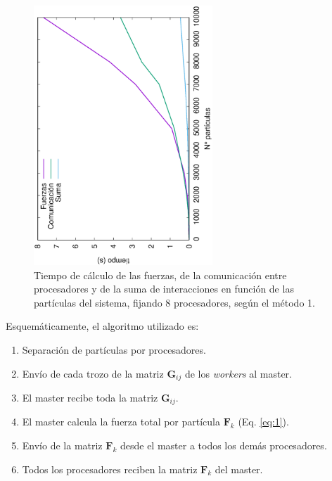 \documentclass[onecolumn]{article}
\renewcommand{\vec}[1]{\mathbf{#1}}
\begin{document}
\begin{figure}[ht]
\begin{center}
\includegraphics[width=0.6\textwidth, angle=-90]{time_particlesE.eps}
\caption{Tiempo de cálculo de las fuerzas, de la comunicación entre procesadores y de la suma de interacciones en función de las partículas del sistema, fijando 8 procesadores, según el método 1.}
\label{elena_1}
\end{center}
\end{figure}

Esquemáticamente, el algoritmo utilizado es:

\begin{enumerate}
    \item Separación de partículas por procesadores.
    
    \item Envío de cada trozo de la matriz $\vec{G}_{ij}$ de los \textit{workers} al master.
    \item El master recibe toda la matriz $\vec{G}_{ij}$.
    \item El master calcula la fuerza total por partícula $\vec{F}_{k}$ (Eq. \ref{eq:1}).
    \item Envío de la matriz $\vec{F}_{k}$ desde el master a todos los demás procesadores.
    \item Todos los procesadores reciben la matriz $\vec{F}_{k}$ del master.
\end{enumerate}
\end{document}
